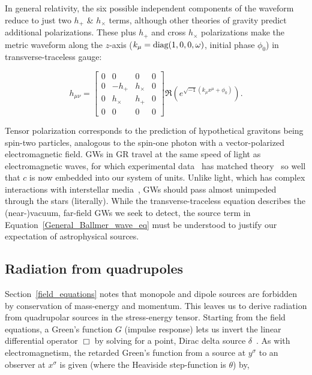 In general relativity, the six possible independent components of the waveform reduce to just two $h_+$ \& $h_\times$ terms, although other theories of gravity predict additional polarizations.
These plus $h_+$ and cross $h_\times$ polarizations make the metric waveform along the $z$-axis ($k_\mu = \textup{diag}(1,0,0,\omega)$, initial phase $\phi_0$) in transverse-traceless gauge:

\begin{equation}
h_{\mu\nu} =
\left[
\begin{array}{cccc}
0 & 0 & 0 & 0\\
0 & -h_+ & h_\times & 0 \\
0 & h_\times & h_+ & 0\\
0 & 0 & 0 & 0
\end{array} \right] \Re \left(e^{\sqrt{-1} (k_\mu x^\mu + \phi_0)} \right).
\label{GW-matrix-eq}
\end{equation}

\noindent Tensor polarization corresponds to the prediction of hypothetical gravitons being spin-two particles, analogous to the spin-one photon with a vector-polarized electromagnetic field.
GWs in GR travel at the same speed of light as electromagnetic waves, for which experimental data~\cite{CODATA} has matched theory~\cite{GriffithsE} so well that $c$ is now embedded into our system of units.
Unlike light, which has complex interactions with interstellar media~\cite{Caldwell1981,McKee1977}, GWs should pass almost unimpeded through the stars (literally). 
While the transverse-traceless equation describes the (near-)vacuum, far-field GWs we seek to detect, the source term in Equation~\ref{General_Ballmer_wave_eq} must be understood to justify our expectation of astrophysical sources.


        \subsection{Radiation from quadrupoles}
        \label{radiation}

Section~\ref{field_equations} notes that monopole and dipole sources are forbidden by conservation of mass-energy and momentum. This leaves us to derive radiation from quadrupolar sources in the stress-energy tensor.
Starting from the field equations, a Green's function $G$ (impulse response) lets us invert the linear differential operator $\Box$ by solving for a point, Dirac delta source $\delta$~\cite{Carroll1997}.
As with electromagnetism, the retarded Green's function from a source at $y^\sigma$ to an observer at $x^\sigma$ is given (where the Heaviside step-function is $\theta$) by, 

